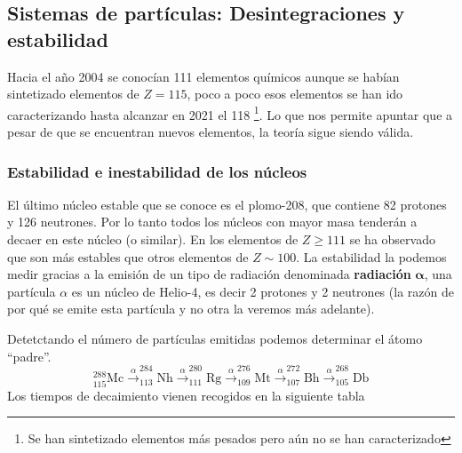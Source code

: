 \subsection{Sistemas de partículas: Desintegraciones y estabilidad}
Hacia el año 2004 se conocían 111 elementos químicos aunque se habían sintetizado elementos de $Z=115$, poco a poco esos elementos se han ido caracterizando hasta alcanzar en 2021 el 118 \footnote{Se han sintetizado elementos más pesados pero aún no se han caracterizado}. Lo que nos permite apuntar que a pesar de que se encuentran nuevos elementos, la teoría sigue siendo válida.
\subsubsection{Estabilidad e inestabilidad de los núcleos}
El último núcleo estable que se conoce es el plomo-208, que contiene 82 protones y 126 neutrones. Por lo tanto todos los núcleos con mayor masa tenderán a decaer en este núcleo (o similar).\newpage
En los elementos de $Z\geq 111$ se ha observado que son más estables que otros elementos de $Z\sim 100$. La estabilidad la podemos medir gracias a la emisión de un tipo de radiación denominada \textbf{radiación} $\bm{\alpha}$, una partícula $\alpha$ es un núcleo de Helio-4, es decir 2 protones y 2 neutrones (la razón de por qué se emite esta partícula y no otra la veremos más adelante).
\begin{tcolorbox}[colback=airforceblue!20, colframe=airforceblue, title=Ejemplo: Decaimiento del $^{288}_{115}\text{Mc}$ en $^{268}_{105}\text{Db}$]
Detetctando el número de partículas emitidas podemos determinar el átomo ``padre''.
\begin{equation*}
^{288}_{115}\text{Mc} \xrightarrow{\alpha} ^{284}_{113}\text{Nh} \xrightarrow{\alpha} ^{280}_{111}\text{Rg} \xrightarrow{\alpha} ^{276}_{109}\text{Mt} \xrightarrow{\alpha} ^{272}_{107}\text{Bh} \xrightarrow{\alpha} ^{268}_{105}\text{Db}
\end{equation*}
Los tiempos de decaimiento vienen recogidos en la siguiente tabla
\end{tcolorbox}

